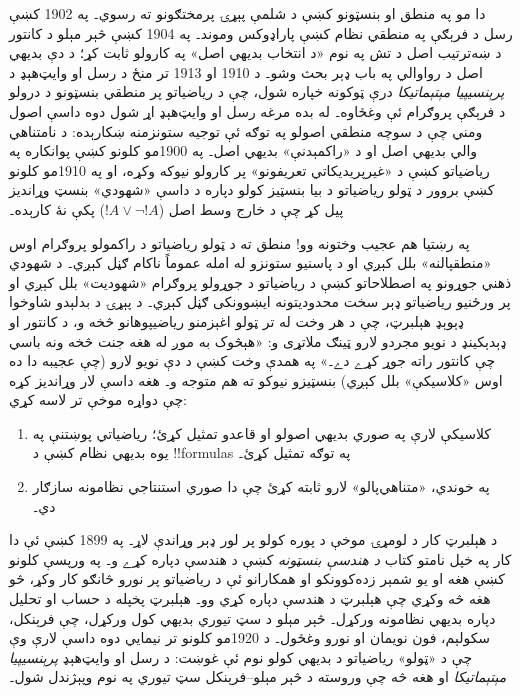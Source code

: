 \documentclass[../../../include/open-logic-section]{subfiles}
\begin{document}
دا مو په منطق او بنسټونو کښې د شلمې پېړۍ پرمختګونو ته رسوي۔ په 1902
کښې رسل د فرېګې په منطقي نظام کښې پاراډوکس وموند۔ په 1904 کښې
څېر مېلو د کانتور د ښه‌ترتيب اصل د تش په نوم «د انتخاب بديهي اصل» په
کارولو ثابت کړ؛ د دې بديهي اصل د رواوالي په باب ډېر بحث وشو۔ د 1910
او 1913 تر منځ د رسل او وايټ‌هېډ د \emph{پرېنسيپيا مېتېماتيکا} درې
ټوکونه خپاره شول، چې د رياضياتو پر منطقي بنسټونو د درولو د فرېګې
پروګرام ئې وغځاوه۔ له بده مرغه رسل او وايټ‌هېډ اړ شول دوه داسې اصول
ومني چې د سوچه منطقي اصولو په توګه ئې توجيه ستونزمنه ښکارېده: د
نامتناهي والي بديهي اصل او د «راکمېدنې» بديهي اصل۔ په 1900مو کلونو
کښې پوانکاره په رياضياتو کښې د «غيرپريديکاتي تعريفونو» پر کارولو
نيوکه وکړه، او په 1910مو کلونو کښې بروور د ټولو رياضياتو د بيا بنسټيز
کولو دپاره د داسې «شهودي» بنسټ وړانديز پيل کړ چې د خارج وسط اصل
($!A \lor \lnot !A$) پکې نۀ کارېده۔

په رښتيا هم عجيب وختونه وو!{} منطق ته د ټولو رياضياتو د راکمولو
پروګرام اوس «منطقپالنه» بلل کېږي او د پاسنيو ستونزو له امله عموماً
ناکام ګڼل کېږي۔ د شهودي ذهني جوړونو په اصطلاحاتو کښې د رياضياتو د
جوړولو پروګرام «شهوديت» بلل کېږي او پر ورځنيو رياضياتو ډېر سخت
محدوديتونه ايښوونکی ګڼل کېږي۔ د پېړۍ د بدلېدو شاوخوا ډېوېډ هېلبرټ،
چې د هر وخت له تر ټولو اغېزمنو رياضيپوهانو څخه و، د کانتور او
ډېدېکينډ د نويو مجردو لارو ټينګ ملاتړی و: «هېڅوک به موږ له هغه جنت
څخه ونه باسي چې کانتور راته جوړ کړے دے۔» په همدې وخت کښې د دې نويو
لارو (چې عجيبه دا ده اوس «کلاسیکې» بلل کېږي) بنسټيزو نيوکو ته هم
متوجه و۔ هغه داسې لار وړانديز کړه چې دواړه موخې تر لاسه کړي:
\begin{enumerate}
\item کلاسیکې لارې په صوري بديهي اصولو او قاعدو تمثيل کړئ؛ رياضياتي
  پوښتنې په يوه بديهي نظام کښې د !!{formula}s په توګه تمثيل کړئ۔
\item په خوندي، «متناهي‌پالو» لارو ثابته کړئ چې دا صوري استنتاجي
  نظامونه سازګار دي۔
\end{enumerate}

د هېلبرټ کار د لومړۍ موخې د پوره کولو پر لور ډېر وړاندې لاړ۔ په 1899
کښې ئې دا کار په خپل نامتو کتاب \emph{د هندسې بنسټونه} کښې د هندسې
دپاره کړے و۔ په ورپسې کلونو کښې هغه او يو شمېر زده‌کوونکو او
همکارانو ئې د رياضياتو پر نورو څانګو کار وکړ، څو هغه څه وکړي چې
هېلبرټ د هندسې دپاره کړي وو۔ هېلبرټ پخپله د حساب او تحليل دپاره
بديهي نظامونه ورکړل۔ څېر مېلو د سټ تيوري بديهي کول ورکړل، چې
فرېنکل، سکولېم، فون نويمان او نورو وغځول۔ د 1920مو کلونو تر نيمايي
دوه داسې لارې وې چې د «ټولو» رياضياتو د بديهي کولو نوم ئې غوښت:
د رسل او وايټ‌هېډ \emph{پرېنسيپيا مېتېماتيکا} او هغه څه چې وروسته
د څېر مېلو--فرېنکل سټ تيوري په نوم وپېژندل شول۔
\end{document}
